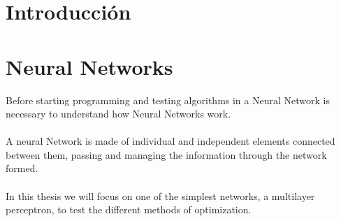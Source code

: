 \documentclass[a4paper, 11pt]{article}
\begin{document}
\section*{Introducción}
\newpage

\newpage \pagestyle{extended_plain}
\section{Neural Networks} 
Before starting programming and testing algorithms in a Neural Network is necessary to understand how Neural Networks work.\\\\
A neural Network is made of individual and independent elements connected between them, passing and managing the information through the network formed.\\\\
In this thesis we will focus on one of the simplest networks, a multilayer perceptron, to test the different methods of optimization.
\end{document}
